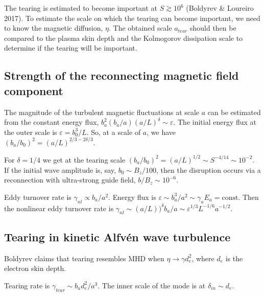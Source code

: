 \documentclass[usenatbib,twocolumn]{aastex63}
\begin{document}
\begin{appendix}
The tearing is estimated to become important at $S \gtrsim 10^6$ (Boldyrev \& Loureiro 2017).
To estimate the scale on which the tearing can become important, we need to know the magnetic diffusion, $\eta$.
The obtained scale $a_{tear}$ should then be compared to the plasma skin depth and the Kolmogorov dissipation scale to determine if the tearing will be important.

\subsection{Strength of the reconnecting magnetic field component}

The magnitude of the turbulent magnetic fluctuations at scale $a$ can be estimated from the constant energy flux, $b_a^2 (b_a/a)(a/L)^{\delta} \sim \varepsilon$.
The initial energy flux at the outer scale is $\varepsilon = b_0^3 /L$.
So, at a scale of $a$, we have 
$(b_a/b_0)^2 = (a/L)^{2/3 -2\delta/3}$.

For $\delta = 1/4$ we get at the tearing scale $(b_a/b_0)^2 = (a/L)^{1/2} \sim S^{-4/14} \sim 10^{-2}$.
If the initial wave amplitude is, say, $b_0 \sim B_z/100$, then the disruption occurs via a reconnection with ultra-strong guide field, $b/B_z \sim 10^{-6}$.



Eddy turnover rate is $\gamma_{nl} \propto b_a/a^2$.
Energy flux is $\varepsilon \sim b_a^3/a^2 \sim \gamma_a E_a = \mathrm{const}$.
Then the nonlinear eddy turnover rate is $\gamma_{nl} \sim (a/L))^\delta b_a/a \sim \varepsilon^{1/3} L^{-1/6} a^{-1/2}$.




\subsection{Tearing in kinetic Alfv\'en wave turbulence}

Boldyrev claims that tearing resembles MHD when $\eta \rightarrow \gamma d_e^2$, where $d_e$ is the electron skin depth.

Tearing rate is $\gamma_{tear} \sim b_a d_e^2/a^3$.
The inner scale of the mode is at $\delta_{in} \sim d_e$.



\end{appendix}
\end{document}

